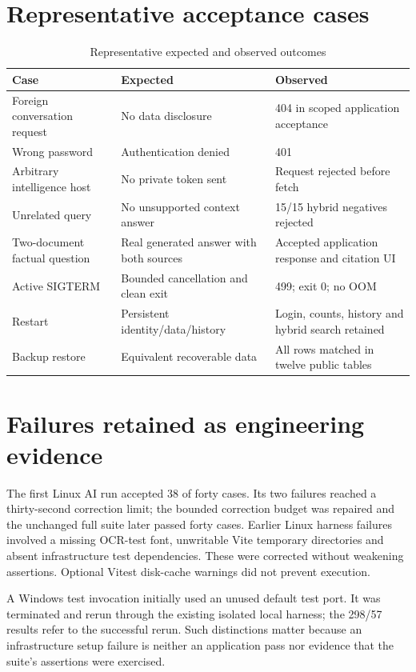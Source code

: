 \section{Representative acceptance cases}
\par\begin{table}[htbp]\caption{Representative expected and observed outcomes}\small\begin{tabularx}{\linewidth}{p{.29\linewidth}YY}\toprule Case&Expected&Observed\\\midrule
Foreign conversation request&No data disclosure&404 in scoped application acceptance\\
Wrong password&Authentication denied&401\\
Arbitrary intelligence host&No private token sent&Request rejected before fetch\\
Unrelated query&No unsupported context answer&15/15 hybrid negatives rejected\\
Two-document factual question&Real generated answer with both sources&Accepted application response and citation UI\\
Active SIGTERM&Bounded cancellation and clean exit&499; exit 0; no OOM\\
Restart&Persistent identity/data/history&Login, counts, history and hybrid search retained\\
Backup restore&Equivalent recoverable data&All rows matched in twelve public tables\\\bottomrule\end{tabularx}\end{table}\par
\section{Failures retained as engineering evidence}
The first Linux AI run accepted 38 of forty cases. Its two failures reached a thirty-second correction limit; the bounded correction budget was repaired and the unchanged full suite later passed forty cases. Earlier Linux harness failures involved a missing OCR-test font, unwritable Vite temporary directories and absent infrastructure test dependencies. These were corrected without weakening assertions. Optional Vitest disk-cache warnings did not prevent execution.

A Windows test invocation initially used an unused default test port. It was terminated and rerun through the existing isolated local harness; the 298/57 results refer to the successful rerun. Such distinctions matter because an infrastructure setup failure is neither an application pass nor evidence that the suite's assertions were exercised.
\FloatBarrier
